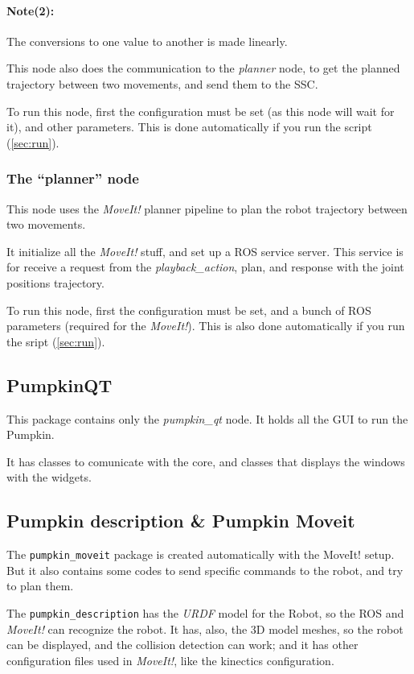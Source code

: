 \documentclass[oneside,a4paper,titlepage]{article}
\begin{document}
\paragraph{Note(2): }The conversions to one value to another is made linearly.

This node also does the communication to the \emph{planner} node, to get the planned trajectory between two movements, and send them to the SSC.

To run this node, first the configuration must be set (as this node will wait for it), and other parameters. This is done automatically if you run the script (\ref{sec:run}).

\subsubsection{The ``planner'' node}

This node uses the \emph{MoveIt!} planner pipeline to plan the robot trajectory between two movements.

It initialize all the \emph{MoveIt!} stuff, and set up a ROS service server. This service is for receive a request from the \emph{playback\_action}, plan, and response with the joint positions trajectory.

To run this node, first the configuration must be set, and a bunch of ROS parameters (required for the \emph{MoveIt!}). This is also done automatically if you run the sript (\ref{sec:run}).

\subsection{PumpkinQT}

This package contains only the \emph{pumpkin\_qt} node. It holds all the GUI to run the Pumpkin.

It has classes to comunicate with the core, and classes that displays the windows with the widgets.

\subsection{Pumpkin description \& Pumpkin Moveit}

The \texttt{pumpkin\_moveit} package is created automatically with the MoveIt! setup.
But it also contains some codes to send specific commands to the robot, and try to plan them.

The \texttt{pumpkin\_description} has the \emph{URDF} model for the Robot, so the ROS and \emph{MoveIt!} can recognize the robot. It has, also, the 3D model meshes, so the robot can be displayed, and the collision detection can work; and it has other configuration files used in \emph{MoveIt!}, like the kinectics configuration.
\end{document}
